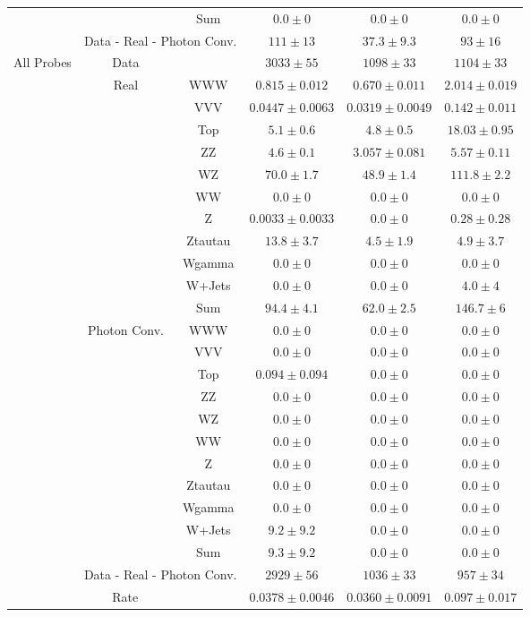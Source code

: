 \begin{tabular}{|c|cc||c|c|c|}
\cline{3-6}
&& Sum &  $0.0 \pm 0$ &  $0.0 \pm 0$ &  $0.0 \pm 0$\\ 
\cline{2-6}
\cline{2-6}
&\multicolumn{2}{|c||}{Data - Real - Photon Conv.} &  $111 \pm 13$ &  $37.3 \pm 9.3$ &  $ 93 \pm 16$\\ 
\hline
\hline
\multirow{23}{*}{All Probes}&Data &  & $3033 \pm 55$ &  $1098 \pm 33$ &  $1104 \pm 33$\\ 
\cline{2-6}
&\multirow{11}{*}{Real}& WWW &  $0.815 \pm 0.012$ &  $0.670 \pm 0.011$ &  $2.014 \pm 0.019$\\ 
&& VVV &  $0.0447 \pm 0.0063$ &  $0.0319 \pm 0.0049$ &  $0.142 \pm 0.011$\\ 
&& Top &  $5.1 \pm 0.6$ &  $4.8 \pm 0.5$ &  $18.03 \pm 0.95$\\ 
&& ZZ &  $4.6 \pm 0.1$ &  $3.057 \pm 0.081$ &  $5.57 \pm 0.11$\\ 
&& WZ &  $70.0 \pm 1.7$ &  $48.9 \pm 1.4$ &  $111.8 \pm 2.2$\\ 
&& WW &  $0.0 \pm 0$ &  $0.0 \pm 0$ &  $0.0 \pm 0$\\ 
&& Z &  $0.0033 \pm 0.0033$ &  $0.0 \pm 0$ &  $0.28 \pm 0.28$\\ 
&& Ztautau &  $13.8 \pm 3.7$ &  $4.5 \pm 1.9$ &  $4.9 \pm 3.7$\\ 
&& Wgamma &  $0.0 \pm 0$ &  $0.0 \pm 0$ &  $0.0 \pm 0$\\ 
&& W+Jets &  $0.0 \pm 0$ &  $0.0 \pm 0$ &  $4.0 \pm 4$\\ 
\cline{3-6}
&& Sum &  $94.4 \pm 4.1$ &  $62.0 \pm 2.5$ &  $146.7 \pm 6$\\ 
\cline{2-6}
\cline{2-6}
&\multirow{11}{*}{Photon Conv.}& WWW &  $0.0 \pm 0$ &  $0.0 \pm 0$ &  $0.0 \pm 0$\\ 
&& VVV &  $0.0 \pm 0$ &  $0.0 \pm 0$ &  $0.0 \pm 0$\\ 
&& Top &  $0.094 \pm 0.094$ &  $0.0 \pm 0$ &  $0.0 \pm 0$\\ 
&& ZZ &  $0.0 \pm 0$ &  $0.0 \pm 0$ &  $0.0 \pm 0$\\ 
&& WZ &  $0.0 \pm 0$ &  $0.0 \pm 0$ &  $0.0 \pm 0$\\ 
&& WW &  $0.0 \pm 0$ &  $0.0 \pm 0$ &  $0.0 \pm 0$\\ 
&& Z &  $0.0 \pm 0$ &  $0.0 \pm 0$ &  $0.0 \pm 0$\\ 
&& Ztautau &  $0.0 \pm 0$ &  $0.0 \pm 0$ &  $0.0 \pm 0$\\ 
&& Wgamma &  $0.0 \pm 0$ &  $0.0 \pm 0$ &  $0.0 \pm 0$\\ 
&& W+Jets &  $9.2 \pm 9.2$ &  $0.0 \pm 0$ &  $0.0 \pm 0$\\ 
\cline{3-6}
&& Sum &  $9.3 \pm 9.2$ &  $0.0 \pm 0$ &  $0.0 \pm 0$\\ 
\cline{2-6}
\cline{2-6}
&\multicolumn{2}{|c||}{Data - Real - Photon Conv.} &  $2929 \pm 56$ &  $1036 \pm 33$ &  $957 \pm 34$\\ 
\hline
\hline
\multicolumn{3}{|c||}{Rate} &  $0.0378 \pm 0.0046$ &  $0.0360 \pm 0.0091$ &  $0.097 \pm 0.017$\\ 
\hline
\end{tabular}
